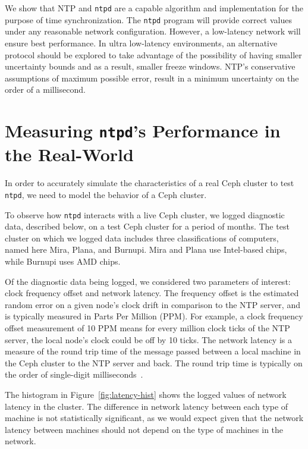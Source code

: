 We show that NTP and \texttt{ntpd} are a capable algorithm and
implementation for the purpose of time synchronization.  
The \texttt{ntpd} program will provide correct values
under any reasonable network configuration. However, a low-latency
network will ensure best performance. In ultra low-latency
environments, an alternative protocol should be explored to take advantage
of the possibility of having smaller uncertainty bounds and as a result, 
smaller freeze windows. NTP's conservative
assumptions of maximum possible error, result in a
minimum uncertainty on the order of a millisecond.



\section{Measuring \texttt{ntpd}'s Performance in the Real-World}

In order to accurately simulate the characteristics of a real Ceph
cluster to test \texttt{ntpd}, we need to model the behavior of a
Ceph cluster.

To observe how \texttt{ntpd} interacts with a live Ceph cluster, we
logged diagnostic data, described below, on a test Ceph cluster 
for a period of months.
The test cluster on which we logged data includes three
classifications of computers, named here Mira, Plana, and
Burnupi. Mira and Plana use Intel-based chips, while Burnupi uses
AMD chips.

Of the diagnostic data being logged, we considered two parameters of
interest: clock frequency offset and network latency.  The
frequency offset is the estimated random error on a given node's clock
drift in comparison to the NTP server, and is typically measured in
Parts Per Million (PPM). For example, a clock frequency offset
measurement of 10 PPM means for every million clock ticks of the
NTP server, the local
node's clock could be off by 10 ticks. The network latency is a
measure of the round trip time of the message passed between a local
machine in the Ceph cluster to the NTP server and back. The round trip
time is typically on the order of single-digit milliseconds~\citep{Sage}.

The histogram in Figure~\ref{fig:latency-hist} shows the logged values
of network latency in the cluster. The difference in network latency
between each type of machine is not statistically significant, as we
would expect given that the network latency between machines should
not depend on the type of machines in the network.

